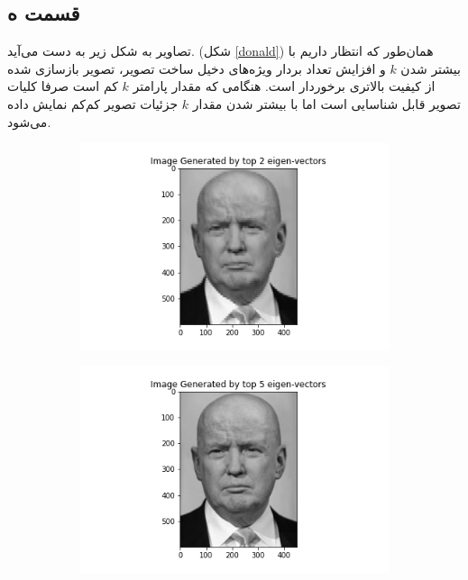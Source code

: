 \documentclass{article}
\begin{document}
\subsection*{قسمت ه}

تصاویر به شکل زیر به دست می‌آید. (شکل \ref{donald}) همان‌طور که انتظار داریم با بیشتر شدن $k$ و افزایش تعداد بردار‌ ویژه‌های
دخیل ساخت تصویر، تصویر بازسازی شده از کیفیت بالاتری برخوردار است. هنگامی که مقدار پارامتر $k$ کم است صرفا کلیات تصویر
قابل شناسایی است اما با بیشتر شدن مقدار $k$ جزئیات تصویر کم‌کم نمایش داده می‌شود.

\begin{figure}[h]
    \begin{subfigure}{0.2\linewidth}
        \centering
        \includegraphics[scale=0.2]{images/q4/donald/donald_2.png}
    \end{subfigure}
    \hfill
    \begin{subfigure}{0.2\linewidth}
        \centering
        \includegraphics[scale=0.2]{images/q4/donald/donald_5.png}
    \end{subfigure}
    \hfill
    \begin{subfigure}{0.2\linewidth}

\end{subfigure}
\end{figure}
\end{document}
